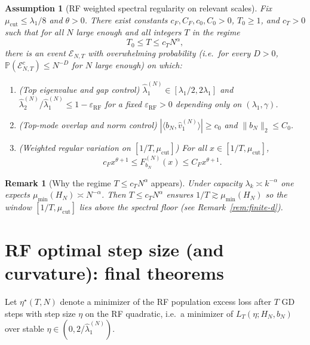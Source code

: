 \documentclass[11pt]{article}
\newtheorem{assumption}{Assumption}
\newtheorem{remark}{Remark}
\begin{document}
\begin{assumption}[RF weighted spectral regularity on relevant scales]\label{ass:RF-wRV}
Fix $\mu_{\mathrm{cut}}\le \lambda_1/8$ and $\theta>0$. There exist constants
$c_F,C_F,c_0,C_0>0$, $T_0\ge 1$, and $c_T>0$ such that for all $N$ large enough and all integers
$T$ in the regime
\[
T_0\le T\le c_T N^\alpha,
\]
there is an event $\mathcal E_{N,T}$ with \emph{overwhelming probability}
(i.e.\ for every $D>0$, $\mathbb P(\mathcal E_{N,T}^c)\le N^{-D}$ for $N$ large enough) on which:
\begin{enumerate}[label=(\alph*),leftmargin=*]
\item (\emph{Top eigenvalue and gap control})
$\widehat\lambda_1^{(N)}\in[\lambda_1/2,2\lambda_1]$ and
$\widehat\lambda_2^{(N)}/\widehat\lambda_1^{(N)}\le 1-\varepsilon_{\mathrm{RF}}$
for a fixed $\varepsilon_{\mathrm{RF}}>0$ depending only on $(\lambda_1,\gamma)$.
\item (\emph{Top-mode overlap and norm control})
$|\langle b_N,\widehat v_1^{(N)}\rangle|\ge c_0$ and $\|b_N\|_2\le C_0$.
\item (\emph{Weighted regular variation on $[1/T,\mu_{\mathrm{cut}}]$})
For all $x\in[1/T,\mu_{\mathrm{cut}}]$,
\[
c_F x^{\theta+1}\le F^{(N)}_{b_N}(x)\le C_F x^{\theta+1}.
\]
\end{enumerate}
\end{assumption}

\begin{remark}[Why the regime $T\le c_TN^\alpha$ appears]\label{rem:T-regime}
Under capacity $\lambda_k\asymp k^{-\alpha}$ one expects $\mu_{\min}(H_N)\asymp N^{-\alpha}$.
Then $T\le c_TN^\alpha$ ensures $1/T\gtrsim \mu_{\min}(H_N)$ so the window $[1/T,\mu_{\mathrm{cut}}]$ lies above the
spectral floor (see Remark~\ref{rem:finite-d}).
\end{remark}

\section{RF optimal step size (and curvature): final theorems}

Let $\eta^\star(T,N)$ denote a minimizer of the RF population excess loss after $T$ GD
steps with step size $\eta$ on the RF quadratic, i.e.\ a minimizer of $L_T(\eta;H_N,b_N)$
over stable $\eta\in(0,2/\widehat\lambda_1^{(N)})$.
\end{document}
